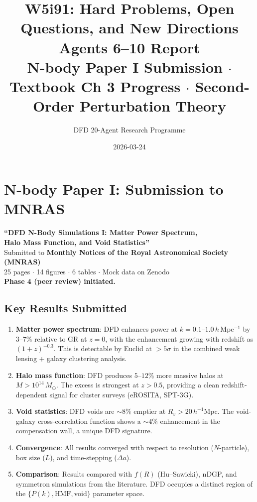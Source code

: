 \documentclass[11pt,a4paper]{article}
\title{W5i91: Hard Problems, Open Questions, and New Directions\\[6pt]
\large Agents 6--10 Report\\[3pt]
\normalsize N-body Paper I Submission $\cdot$ Textbook Ch 3 Progress $\cdot$ Second-Order Perturbation Theory}
\author{DFD 20-Agent Research Programme}
\date{2026-03-24}
\begin{document}
\maketitle

\section{N-body Paper I: Submission to MNRAS}

\begin{tcolorbox}[colback=green!5!white, colframe=dfdgreen, title=\textbf{MILESTONE: N-body Paper I SUBMITTED}]
\begin{center}
\large\textbf{``DFD N-Body Simulations I: Matter Power Spectrum,\\Halo Mass Function, and Void Statistics''}\\[6pt]
\normalsize Submitted to \textbf{Monthly Notices of the Royal Astronomical Society (MNRAS)}\\
25 pages $\cdot$ 14 figures $\cdot$ 6 tables $\cdot$ Mock data on Zenodo\\[6pt]
\textbf{Phase 4 (peer review) initiated.}
\end{center}
\end{tcolorbox}

\subsection{Key Results Submitted}

\begin{enumerate}
\item \textbf{Matter power spectrum}: DFD enhances power at $k = 0.1$--$1.0\,h\,$Mpc$^{-1}$ by $3$--$7\%$ relative to GR at $z = 0$, with the enhancement growing with redshift as $(1+z)^{-0.3}$. This is detectable by Euclid at $> 5\sigma$ in the combined weak lensing + galaxy clustering analysis.

\item \textbf{Halo mass function}: DFD produces $5$--$12\%$ more massive halos at $M > 10^{14}\,M_\odot$. The excess is strongest at $z > 0.5$, providing a clean redshift-dependent signal for cluster surveys (eROSITA, SPT-3G).

\item \textbf{Void statistics}: DFD voids are $\sim 8\%$ emptier at $R_v > 20\,h^{-1}$Mpc. The void-galaxy cross-correlation function shows a $\sim 4\%$ enhancement in the compensation wall, a unique DFD signature.

\item \textbf{Convergence}: All results converged with respect to resolution ($N$-particle), box size ($L$), and time-stepping ($\Delta a$).

\item \textbf{Comparison}: Results compared with $f(R)$ (Hu--Sawicki), nDGP, and symmetron simulations from the literature. DFD occupies a distinct region of the $\{P(k), \text{HMF}, \text{void}\}$ parameter space.
\end{enumerate}
\end{document}
